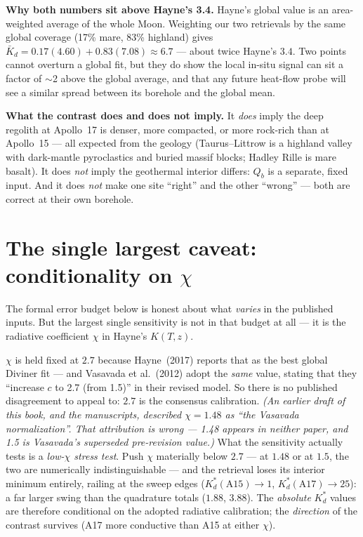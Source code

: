 \documentclass[11pt]{report}
\begin{document}
\noindent\textbf{Why both numbers sit above Hayne's 3.4.} Hayne's global value is
an area-weighted average of the whole Moon. Weighting our two retrievals by the
same global coverage (17\% mare, 83\% highland) gives
$\bar K_d=0.17(4.60)+0.83(7.08)\approx6.7$ --- about twice Hayne's $3.4$. Two
points cannot overturn a global fit, but they do show the local in-situ signal
can sit a factor of $\sim$2 above the global average, and that any future
heat-flow probe will see a similar spread between its borehole and the global
mean.

\noindent\textbf{What the contrast does and does not imply.} It \emph{does} imply
the deep regolith at Apollo~17 is denser, more compacted, or more rock-rich than
at Apollo~15 --- all expected from the geology (Taurus--Littrow is a highland
valley with dark-mantle pyroclastics and buried massif blocks; Hadley Rille is
mare basalt). It does \emph{not} imply the geothermal interior differs: $Q_b$ is
a separate, fixed input. And it does \emph{not} make one site ``right'' and the
other ``wrong'' --- both are correct at their own borehole.

\section{The single largest caveat: conditionality on $\chi$}\label{sec:chi}

The formal error budget below is honest about what \emph{varies} in the published
inputs. But the largest single sensitivity is not in that budget at all --- it is
the radiative coefficient $\chi$ in Hayne's $K(T,z)$.

\begin{warn}
$\chi$ is held fixed at $2.7$ because Hayne~(2017) reports that as the best global
Diviner fit --- and Vasavada et al.~(2012) adopt the \emph{same} value, stating that
they ``increase $c$ to 2.7 (from 1.5)'' in their revised model. So there is no
published disagreement to appeal to: $2.7$ is the consensus calibration.
\emph{(An earlier draft of this book, and the manuscripts, described
$\chi=1.48$ as ``the Vasavada normalization''. That attribution is wrong --- 1.48
appears in neither paper, and 1.5 is Vasavada's superseded pre-revision value.)}
What the sensitivity actually tests is a \emph{low-$\chi$ stress test}. Push $\chi$
materially below $2.7$ --- at $1.48$ or at $1.5$, the two are numerically
indistinguishable --- and the retrieval loses its interior minimum entirely, railing
at the sweep edges ($K_d^{*}(\mathrm{A15})\!\to\!1$,
$K_d^{*}(\mathrm{A17})\!\to\!25$): a far larger swing than the quadrature totals
($1.88$, $3.88$). The \emph{absolute} $K_d^{*}$ values are therefore conditional on
the adopted radiative calibration; the \emph{direction} of the contrast survives
(A17 more conductive than A15 at either $\chi$).
\end{warn}
\end{document}
